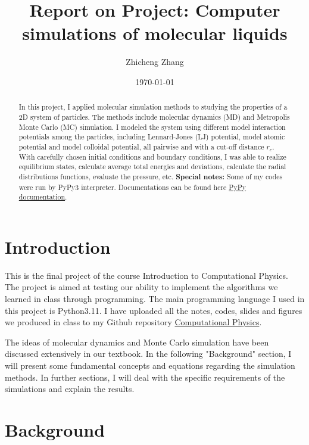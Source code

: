 \documentclass[letterpaper,12pt]{article}
\numberwithin{equation}{section}
\begin{document}
\title{Report on \textbf{Project: Computer simulations of molecular liquids}}
\author{Zhicheng Zhang}
\date{\today}
\maketitle

\begin{abstract}
In this project, I applied molecular simulation methods to studying the properties of a 2D system of particles. The methods include molecular dynamics (MD) and Metropolis Monte Carlo (MC) simulation. I modeled the system using different model interaction potentials among the particles, including Lennard-Jones (LJ) potential, model atomic potential and model colloidal potential, all pairwise and with a cut-off distance $r_c$. With carefully chosen initial conditions and boundary conditions, I was able to realize equilibrium states, calculate average total energies and deviations, calculate the radial distributions functions, evaluate the pressure, etc. \textbf{Special notes:} Some of my codes were run by PyPy3 interpreter. Documentations can be found here \href{https://doc.pypy.org/en/latest/}{PyPy documentation}.
\end{abstract}


\section{Introduction}

This is the final project of the course Introduction to Computational Physics. The project is aimed at testing our ability to implement the algorithms we learned in class through programming. The main programming language I used in this project is Python3.11. I have uploaded all the notes, codes, slides and figures we produced in class to my Github repository \href{https://github.com/Tom20200112/comp_physics}{Computational Physics}.

The ideas of molecular dynamics and Monte Carlo simulation have been discussed extensively in our textbook. In the following "Background" section, I will present some fundamental concepts and equations regarding the simulation methods. In further sections, I will deal with the specific requirements of the simulations and explain the results.

\section{Background}
\end{document}
